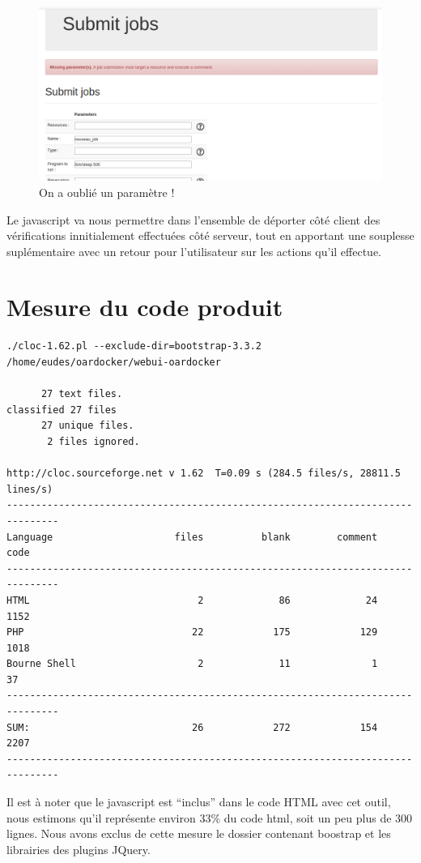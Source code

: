 \documentclass[a4paper,10pt]{article}
\begin{document}
\begin{figure}[h]
  \begin{center}
    \includegraphics[scale=0.3]{./job.png}
   \caption{\label{job} On a oublié un paramètre !}
  \end{center}
\end{figure}

Le javascript va nous permettre dans l'ensemble de déporter côté client des vérifications innitialement effectuées côté serveur,
tout en apportant une souplesse suplémentaire avec un retour pour l'utilisateur sur les actions qu'il effectue.

\section{Mesure du code produit}
\begin{verbatim}
./cloc-1.62.pl --exclude-dir=bootstrap-3.3.2 /home/eudes/oardocker/webui-oardocker

      27 text files.
classified 27 files
      27 unique files.                              
       2 files ignored.

http://cloc.sourceforge.net v 1.62  T=0.09 s (284.5 files/s, 28811.5 lines/s)
-------------------------------------------------------------------------------
Language                     files          blank        comment           code
-------------------------------------------------------------------------------
HTML                             2             86             24           1152
PHP                             22            175            129           1018
Bourne Shell                     2             11              1             37
-------------------------------------------------------------------------------
SUM:                            26            272            154           2207
-------------------------------------------------------------------------------
\end{verbatim}
Il est à noter que le javascript est ``inclus'' dans le code HTML avec cet outil, nous estimons qu'il représente environ 33\% du code html, soit un peu plus de 300 lignes.
Nous avons exclus de cette mesure le dossier contenant boostrap et les librairies des plugins JQuery.
\newpage
\end{document}
